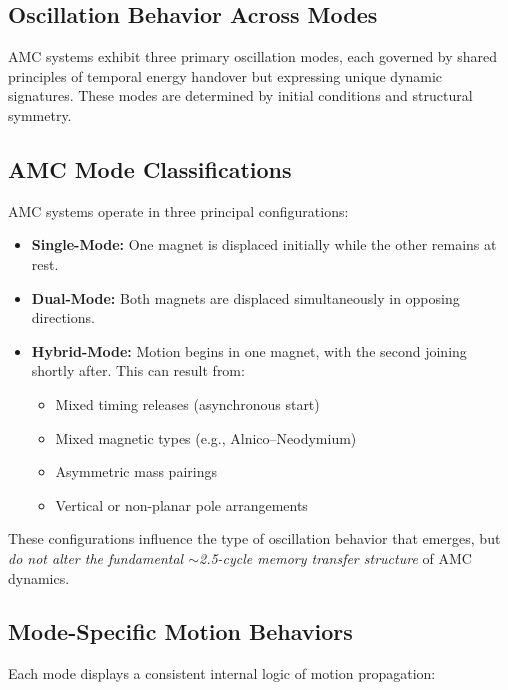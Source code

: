 \documentclass[10pt,aps,pre,onecolumn,superscriptaddress,notitlepage]{revtex4-2}
\begin{document}
\subsection{Oscillation Behavior Across Modes}
AMC systems exhibit three primary oscillation modes, each governed by shared principles of temporal energy handover but expressing unique dynamic signatures. These modes are determined by initial conditions and structural symmetry.

\subsection{AMC Mode Classifications}
AMC systems operate in three principal configurations:

\begin{itemize}
  \item \textbf{Single-Mode:} One magnet is displaced initially while the other remains at rest.
  \item \textbf{Dual-Mode:} Both magnets are displaced simultaneously in opposing directions.
  \item \textbf{Hybrid-Mode:} Motion begins in one magnet, with the second joining shortly after. This can result from:
  \begin{itemize}
      \item Mixed timing releases (asynchronous start)
      \item Mixed magnetic types (e.g., Alnico–Neodymium)
      \item Asymmetric mass pairings
      \item Vertical or non-planar pole arrangements
  \end{itemize}
\end{itemize}

These configurations influence the type of oscillation behavior that emerges, but \textit{do not alter the fundamental $\sim$2.5-cycle memory transfer structure} of AMC dynamics.

\subsection{Mode-Specific Motion Behaviors}
Each mode displays a consistent internal logic of motion propagation:
\end{document}
